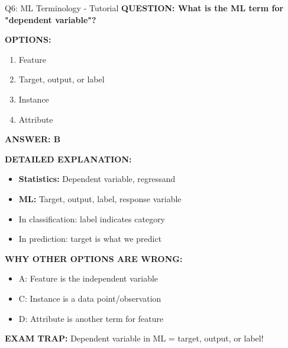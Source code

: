 \documentclass[8pt]{beamer}
\begin{document}
	\begin{frame}{Q6: ML Terminology - Tutorial}
		\fontsize{6.5}{7.5}\selectfont
		\textbf{QUESTION: What is the ML term for "dependent variable"?}
		
		\vspace{0.1cm}
		\textbf{OPTIONS:}
		\begin{enumerate}
			\item Feature
			\item Target, output, or label
			\item Instance
			\item Attribute
		\end{enumerate}
		
		\vspace{0.1cm}
		\textcolor{myblue}{\textbf{ANSWER: B}}
		
		\vspace{0.1cm}
		\textbf{DETAILED EXPLANATION:}
		\begin{itemize}
			\item \textbf{Statistics:} Dependent variable, regressand
			\item \textbf{ML:} Target, output, label, response variable
			\item In classification: label indicates category
			\item In prediction: target is what we predict
		\end{itemize}
		
		\vspace{0.1cm}
		\textcolor{myred}{\textbf{WHY OTHER OPTIONS ARE WRONG:}}
		\begin{itemize}
			\item \textcolor{myred}{A:} Feature is the independent variable
			\item \textcolor{myred}{C:} Instance is a data point/observation
			\item \textcolor{myred}{D:} Attribute is another term for feature
		\end{itemize}
		
		\textcolor{myred}{\textbf{EXAM TRAP:}} Dependent variable in ML = \textcolor{myblue}{target, output, or label}!
	\end{frame}
	
\end{document}
